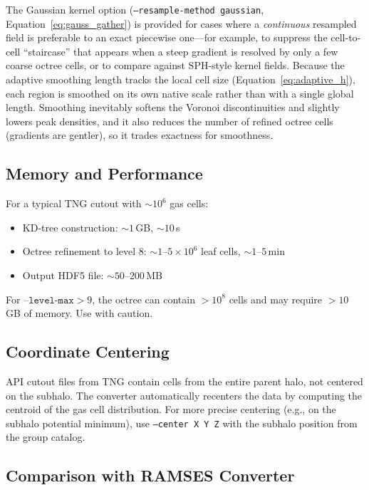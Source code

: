 \documentclass[english,a4paper]{my_memo}
\begin{document}
The Gaussian kernel option (\texttt{--resample-method gaussian},
Equation~\ref{eq:gauss_gather}) is provided for cases where a
\emph{continuous} resampled field is preferable to an exact piecewise
one---for example, to suppress the cell-to-cell ``staircase'' that
appears when a steep gradient is resolved by only a few coarse octree
cells, or to compare against SPH-style kernel fields.  Because the
adaptive smoothing length tracks the local cell size
(Equation~\ref{eq:adaptive_h}), each region is smoothed on its own
native scale rather than with a single global length.  Smoothing
inevitably softens the Voronoi discontinuities and slightly lowers
peak densities, and it also reduces the number of refined octree cells
(gradients are gentler), so it trades exactness for smoothness.

\subsection{Memory and Performance}

For a typical TNG cutout with $\sim 10^6$ gas cells:
\begin{itemize}
\item KD-tree construction: $\sim 1$\,GB, $\sim 10$\,s
\item Octree refinement to level 8: $\sim 1$--$5\times 10^6$ leaf cells,
  $\sim 1$--$5$\,min
\item Output HDF5 file: $\sim 50$--$200$\,MB
\end{itemize}

For $\texttt{--level-max} > 9$, the octree can contain $> 10^8$ cells
and may require $> 10$\,GB of memory.  Use with caution.

\subsection{Coordinate Centering}

API cutout files from TNG contain cells from the entire parent halo,
not centered on the subhalo.  The converter automatically recenters
the data by computing the centroid of the gas cell distribution.
For more precise centering (e.g., on the subhalo potential minimum),
use \texttt{--center X Y Z} with the subhalo position from the
group catalog.

\subsection{Comparison with RAMSES Converter}
\end{document}
